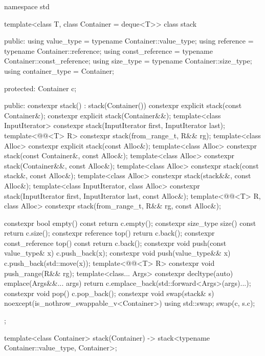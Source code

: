 \begin{codeblock}
namespace std {
  template<class T, class Container = deque<T>>
  class stack {
  public:
    using value_type      = typename Container::value_type;
    using reference       = typename Container::reference;
    using const_reference = typename Container::const_reference;
    using size_type       = typename Container::size_type;
    using container_type  = Container;

  protected:
    Container c;

  public:
    constexpr stack() : stack(Container()) {}
    constexpr explicit stack(const Container&);
    constexpr explicit stack(Container&&);
    template<class InputIterator> constexpr stack(InputIterator first, InputIterator last);
    template<@@<T> R>
      constexpr stack(from_range_t, R&& rg);
    template<class Alloc> constexpr explicit stack(const Alloc&);
    template<class Alloc> constexpr stack(const Container&, const Alloc&);
    template<class Alloc> constexpr stack(Container&&, const Alloc&);
    template<class Alloc> constexpr stack(const stack&, const Alloc&);
    template<class Alloc> constexpr stack(stack&&, const Alloc&);
    template<class InputIterator, class Alloc>
      constexpr stack(InputIterator first, InputIterator last, const Alloc&);
    template<@@<T> R, class Alloc>
      constexpr stack(from_range_t, R&& rg, const Alloc&);

    constexpr bool              empty() const     { return c.empty(); }
    constexpr size_type         size()  const     { return c.size(); }
    constexpr reference         top()             { return c.back(); }
    constexpr const_reference   top()   const     { return c.back(); }
    constexpr void push(const value_type& x)      { c.push_back(x); }
    constexpr void push(value_type&& x)           { c.push_back(std::move(x)); }
    template<@@<T> R>
      constexpr void push_range(R&& rg);
    template<class... Args>
      constexpr decltype(auto) emplace(Args&&... args)
        { return c.emplace_back(std::forward<Args>(args)...); }
    constexpr void pop()                          { c.pop_back(); }
    constexpr void swap(stack& s) noexcept(is_nothrow_swappable_v<Container>)
      { using std::swap; swap(c, s.c); }
  };

  template<class Container>
    stack(Container) -> stack<typename Container::value_type, Container>;

}
\end{codeblock}
